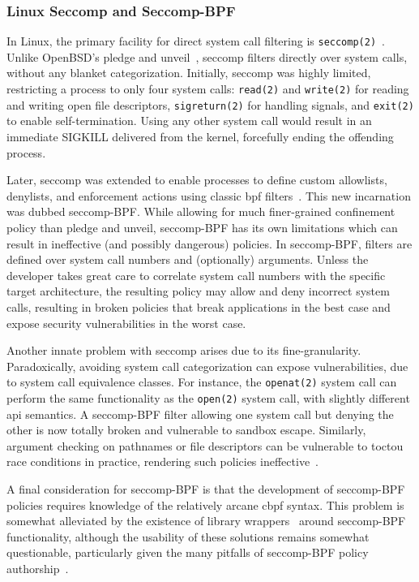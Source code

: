 \subsubsection*{Linux Seccomp and Seccomp-BPF}%
\label{sss:seccomp}

In Linux, the primary facility for direct system call filtering is
\texttt{seccomp(2)}~\cite{anderson2017_comparison, seccomp, prctl, edge2015_seccomp}.
Unlike OpenBSD's pledge and unveil~\cite{pledge, unveil}, seccomp filters directly over
system calls, without any blanket categorization. Initially, seccomp was highly limited,
restricting a process to only four system calls: \texttt{read(2)} and \texttt{write(2)}
for reading and writing open file descriptors, \texttt{sigreturn(2)} for handling signals,
and \texttt{exit(2)} to enable self-termination. Using any other system call would result
in an immediate SIGKILL delivered from the kernel, forcefully ending the offending
process.

Later, seccomp was extended to enable processes to define custom allowlists, denylists,
and enforcement actions using classic \gls{bpf} filters~\cite{edge2015_seccomp}. This new
incarnation was dubbed seccomp-BPF. While allowing for much finer-grained confinement
policy than pledge and unveil, seccomp-BPF has its own limitations which can result in
ineffective (and possibly dangerous) policies. In seccomp-BPF, filters are defined over
system call numbers and (optionally) arguments. Unless the developer takes great care to
correlate system call numbers with the specific target architecture, the resulting policy
may allow and deny incorrect system calls, resulting in broken policies that break
applications in the best case and expose security vulnerabilities in the worst case.

Another innate problem with seccomp arises due to its fine-granularity. Paradoxically,
avoiding system call categorization can expose vulnerabilities, due to system call
equivalence classes. For instance, the \texttt{openat(2)} system call can perform the same
functionality as the \texttt{open(2)} system call, with slightly different \gls{api} semantics.
A seccomp-BPF filter allowing one system call but denying the other is now totally broken
and vulnerable to sandbox escape.  Similarly, argument checking on pathnames or file
descriptors can be vulnerable to \gls{toctou} race conditions in practice, rendering such
policies ineffective~\cite{anderson2017_comparison}.

A final consideration for seccomp-BPF is that the development of seccomp-BPF policies
requires knowledge of the relatively arcane \gls{cbpf} syntax. This problem is somewhat
alleviated by the existence of library wrappers~\cite{libseccomp} around seccomp-BPF
functionality, although the usability of these solutions remains somewhat questionable,
particularly given the many pitfalls of seccomp-BPF policy
authorship~\cite{anderson2017_comparison}.

